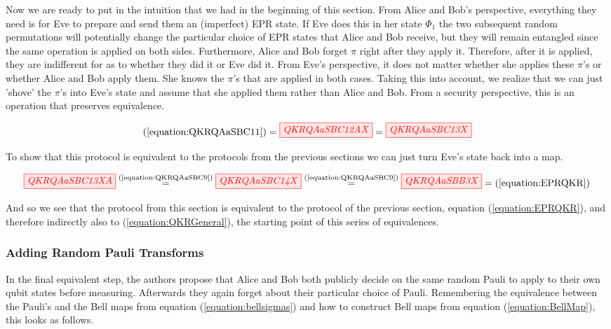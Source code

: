 \documentclass[]{article}
\newcommand{\equaltext}[1]{\ensuremath{\stackrel{\text{#1}}{=}}}
\begin{document}
Now we are ready to put in the intuition that we had in the beginning of this section. From Alice and Bob's perspective, everything they need is for Eve to prepare and send them an (imperfect) EPR state. If Eve does this in her state $\Phi_1$ the two subsequent random permutations will potentially change the particular choice of EPR states that Alice and Bob receive, but they will remain entangled since the same operation is applied on both sides. Furthermore, Alice and Bob forget $\pi$ right after they apply it. Therefore, after it is applied, they are indifferent for as to whether they did it or Eve did it. From Eve's perspective, it does not matter whether she applies these $\pi$'s or whether Alice and Bob apply them. She knows the $\pi$'s that are applied in both cases. Taking this into account, we realize that we can just 'shove' the $\pi$'s into Eve's state and assume that she applied them rather than Alice and Bob. From a security perspective, this is an operation that preserves equivalence. 

\begin{equation}
	\label{equation:QKRQAaSBC13}
	(\ref{equation:QKRQAaSBC11}) = \tikzfig{QKRQAaSBC12AX} = \tikzfig{QKRQAaSBC13X}
\end{equation}

To show that this protocol is equivalent to the protocols from the previous sections we can just turn Eve's state back into a map.

\begin{equation}
\label{equation:QKRQAaSBBFinalResult}
	\tikzfig{QKRQAaSBC13XA} \equaltext{(\ref{equation:QKRQAaSBC9})} \tikzfig{QKRQAaSBC14X} \equaltext{(\ref{equation:QKRQAaSBC9})} \tikzfig{QKRQAaSBB3X} = (\ref{equation:EPRQKR})
\end{equation}

And so we see that the protocol from this section is equivalent to the protocol of the previous section, equation (\ref{equation:EPRQKR}), and therefore indirectly also to (\ref{equation:QKRGeneral}), the starting point of this series of equivalences.

\subsubsection{Adding Random Pauli Transforms}

In the final equivalent step, the authors propose that Alice and Bob both publicly decide on the same random Pauli to apply to their own qubit states before measuring. Afterwards they again forget about their particular choice of Pauli. Remembering the equivalence between the Pauli's and the Bell maps from equation (\ref{equation:bellsigmas}) and how to construct Bell maps from equation (\ref{equation:BellMap}), this looks as follows.
\end{document}
